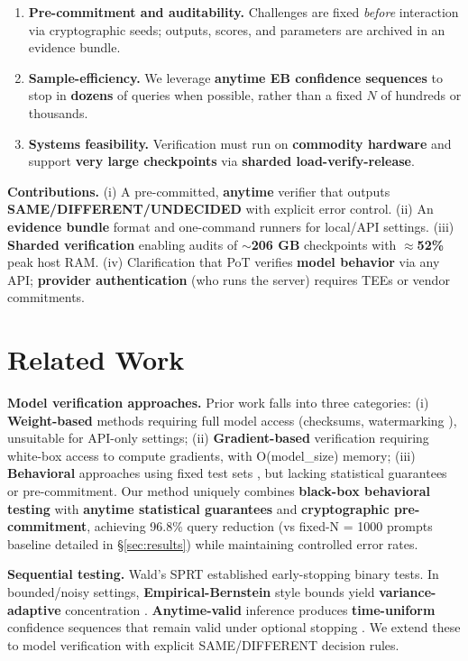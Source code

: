 \documentclass{article}
\begin{document}
\begin{enumerate}
\item \textbf{Pre-commitment and auditability.} Challenges are fixed \emph{before} interaction via cryptographic seeds; outputs, scores, and parameters are archived in an evidence bundle.
\item \textbf{Sample-efficiency.} We leverage \textbf{anytime EB confidence sequences} to stop in \textbf{dozens} of queries when possible, rather than a fixed $N$ of hundreds or thousands.
\item \textbf{Systems feasibility.} Verification must run on \textbf{commodity hardware} and support \textbf{very large checkpoints} via \textbf{sharded load-verify-release}.
\end{enumerate}

\textbf{Contributions.} (i) A pre-committed, \textbf{anytime} verifier that outputs \textbf{SAME/DIFFERENT/UNDECIDED} with explicit error control. (ii) An \textbf{evidence bundle} format and one-command runners for local/API settings. (iii) \textbf{Sharded verification} enabling audits of $\sim$\textbf{206 GB} checkpoints with $\approx$\textbf{52\%} peak host RAM. (iv) Clarification that PoT verifies \textbf{model behavior} via any API; \textbf{provider authentication} (who runs the server) requires TEEs or vendor commitments.

\section{Related Work}

\textbf{Model verification approaches.} Prior work falls into three categories: (i) \textbf{Weight-based} methods requiring full model access (checksums, watermarking \cite{uchida2017embedding,zhang2018protecting}), unsuitable for API-only settings; (ii) \textbf{Gradient-based} verification \cite{jia2021proof} requiring white-box access to compute gradients, with O(model\_size) memory; (iii) \textbf{Behavioral} approaches using fixed test sets \cite{geirhos2020shortcut,hendrycks2021many}, but lacking statistical guarantees or pre-commitment. Our method uniquely combines \textbf{black-box behavioral testing} with \textbf{anytime statistical guarantees} and \textbf{cryptographic pre-commitment}, achieving 96.8\% query reduction (vs fixed-N = 1000 prompts baseline detailed in \S\ref{sec:results}) while maintaining controlled error rates.

\textbf{Sequential testing.} Wald's SPRT \cite{wald1945sprt} established early-stopping binary tests. In bounded/noisy settings, \textbf{Empirical-Bernstein} style bounds yield \textbf{variance-adaptive} concentration \cite{maurer2009empiricalbernstein,audibert2009exploration}. \textbf{Anytime-valid} inference produces \textbf{time-uniform} confidence sequences that remain valid under optional stopping \cite{howard2021timeuniform,howard2021confidenceSequences}. We extend these to model verification with explicit SAME/DIFFERENT decision rules.
\end{document}
